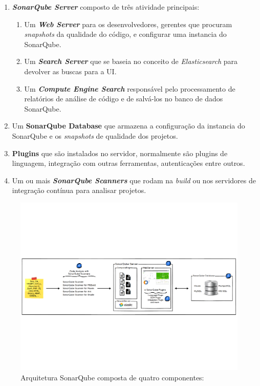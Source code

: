 \begin{enumerate}
\item \textbf{\textit{SonarQube Server}} composto de três atividade principais:
	\begin{enumerate}
	\item Um \textbf{\textit{Web Server}} para os desenvolvedores, gerentes que procuram \textit{snapshots} da qualidade do código, e configurar uma instancia do SonarQube.
	\item Um \textbf{\textit{Search Server}} que se baseia no conceito de \textit{Elasticsearch} para devolver as buscas para a UI.
	\item Um \textbf{\textit{Compute Engine Search}} responsável pelo processamento de relatórios de análise de código e  de salvá-los no banco de dados SonarQube.
	\end{enumerate}
\item Um \textbf{SonarQube Database} que armazena a configuração da instancia do SonarQube e os \textit{snapshots} de qualidade dos projetos.
\item \textbf{Plugins} que são instalados no servidor, normalmente são plugins de linguagem, integração com outras ferramentas, autenticações entre outros.
\item Um ou mais \textbf{\textit{SonarQube Scanners}} que rodam na \textit{build} ou nos servidores de integração contínua para analisar projetos.
\end{enumerate}
\graphicspath{{figuras/}}
\begin{figure}[h]
\centering
\includegraphics[scale=0.5]{Arq_Sonar}
\caption{Arquitetura SonarQube composta de quatro componentes: \cite{sonar}}
\label{img:arq_sonar}
\end{figure}
